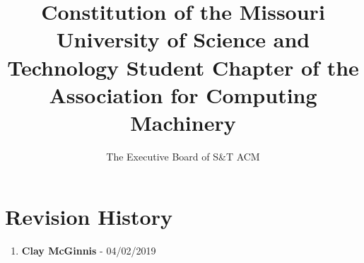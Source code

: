 \documentclass[11pt,a4paper,notitlepage]{article}
\author{The Executive Board of S\&T ACM}
\title{Constitution of the Missouri University of Science and Technology Student Chapter of the Association for Computing Machinery}
\begin{document}
\maketitle


\pagebreak
\tableofcontents











\pagebreak

\section*{Revision History}
\begin{enumerate}[nolistsep]
  \item \textbf{Clay McGinnis} - 04/02/2019
\end{enumerate}
\end{document}
